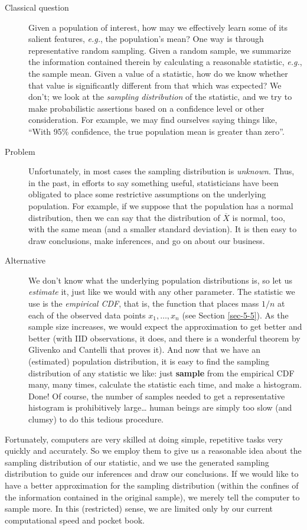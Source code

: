 \documentclass[captions=tableheading]{scrbook}
\begin{document}
\begin{description}
\item[Classical question] Given a population of interest, how may we effectively learn some of its salient features, \emph{e.g.}, the population's mean? One way is through representative random sampling. Given a random sample, we summarize the information contained therein by calculating a reasonable statistic, \emph{e.g.}, the sample mean. Given a value of a statistic, how do we know whether that value is significantly different from that which was expected? We don't; we look at the \emph{sampling distribution} of the statistic, and we try to make probabilistic assertions based on a confidence level or other consideration. For example, we may find ourselves saying things like, ``With 95\% confidence, the true population mean is greater than zero''.
\item[Problem] Unfortunately, in most cases the sampling distribution is \emph{unknown}. Thus, in the past, in efforts to say something useful, statisticians have been obligated to place some restrictive assumptions on the underlying population. For example, if we suppose that the population has a normal distribution, then we can say that the distribution of \(\overline{X}\) is normal, too, with the same mean (and a smaller standard deviation). It is then easy to draw conclusions, make inferences, and go on about our business.
\item[Alternative] We don't know what the underlying population distributions is, so let us \emph{estimate} it, just like we would with any other parameter. The statistic we use is the \emph{empirical CDF}, that is, the function that places mass \(1/n\) at each of the observed data points \(x_{1},\ldots,x_{n}\) (see Section \ref{sec-5-5}). As the sample size increases, we would expect the approximation to get better and better (with IID observations, it does, and there is a wonderful theorem by Glivenko and Cantelli that proves it). And now that we have an (estimated) population distribution, it is easy to find the sampling distribution of any statistic we like: just \textbf{sample} from the empirical CDF many, many times, calculate the statistic each time, and make a histogram. Done! Of course, the number of samples needed to get a representative histogram is prohibitively large\ldots{} human beings are simply too slow (and clumsy) to do this tedious procedure.
\end{description}

Fortunately, computers are very skilled at doing simple, repetitive tasks very quickly and accurately. So we employ them to give us a reasonable idea about the sampling distribution of our statistic, and we use the generated sampling distribution to guide our inferences and draw our conclusions. If we would like to have a better approximation for the sampling distribution (within the confines of the information contained in the original sample), we merely tell the computer to sample more. In this (restricted) sense, we are limited only by our current computational speed and pocket book.
\end{document}
